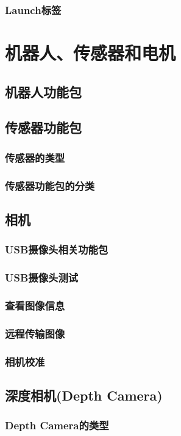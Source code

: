 \documentclass[geye,green,kindle,cn]{elegantnote}
\begin{document}
\subsubsection{Launch标签}
\section{机器人、传感器和电机}
\subsection{机器人功能包}
\subsection{传感器功能包}
\subsubsection{传感器的类型}
\subsubsection{传感器功能包的分类}
\subsection{相机}
\subsubsection{USB摄像头相关功能包}
\subsubsection{USB摄像头测试}
\subsubsection{查看图像信息}
\subsubsection{远程传输图像}
\subsubsection{相机校准}
\subsection{深度相机(Depth Camera)}
\subsubsection{Depth Camera的类型}
\end{document}
